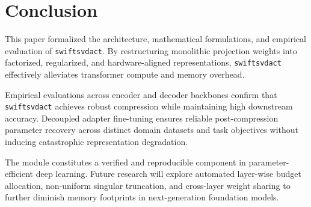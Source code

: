 \section{Conclusion}
This paper formalized the architecture, mathematical formulations, and empirical evaluation of \texttt{swiftsvdact}. By restructuring monolithic projection weights into factorized, regularized, and hardware-aligned representations, \texttt{swiftsvdact} effectively alleviates transformer compute and memory overhead.

Empirical evaluations across encoder and decoder backbones confirm that \texttt{swiftsvdact} achieves robust compression while maintaining high downstream accuracy. Decoupled adapter fine-tuning ensures reliable post-compression parameter recovery across distinct domain datasets and task objectives without inducing catastrophic representation degradation.

The module constitutes a verified and reproducible component in parameter-efficient deep learning. Future research will explore automated layer-wise budget allocation, non-uniform singular truncation, and cross-layer weight sharing to further diminish memory footprints in next-generation foundation models.
